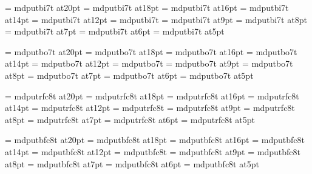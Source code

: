 \font\twentyitbf=      mdputbi7t at20pt
\font\eighteenitbf=    mdputbi7t at18pt
\font\sixteenitbf=     mdputbi7t at16pt
\font\fourteenitbf=    mdputbi7t at14pt
\font\twelveitbf=      mdputbi7t at12pt
\font\itbf=            mdputbi7t
\font\nineitbf=        mdputbi7t at9pt
\font\eightitbf=       mdputbi7t at8pt
\font\sevenitbf=       mdputbi7t at7pt
\font\sixitbf=         mdputbi7t at6pt
\font\fiveitbf=        mdputbi7t at5pt

\font\twentyslbf=      mdputbo7t at20pt
\font\eighteenslbf=    mdputbo7t at18pt
\font\sixteenslbf=     mdputbo7t at16pt
\font\fourteenslbf=    mdputbo7t at14pt
\font\twelveslbf=      mdputbo7t at12pt
\font\slbf=            mdputbo7t
\font\nineslbf=        mdputbo7t at9pt
\font\eightslbf=       mdputbo7t at8pt
\font\sevenslbf=       mdputbo7t at7pt
\font\sixslbf=         mdputbo7t at6pt
\font\fiveslbf=        mdputbo7t at5pt

\font\twentycaps=      mdputrfc8t at20pt
\font\eighteencaps=    mdputrfc8t at18pt
\font\sixteencaps=     mdputrfc8t at16pt
\font\fourteencaps=    mdputrfc8t at14pt
\font\twelvecaps=      mdputrfc8t at12pt
\font\caps=            mdputrfc8t %
\font\ninecaps=        mdputrfc8t at9pt
\font\eightcaps=       mdputrfc8t at8pt
\font\sevencaps=       mdputrfc8t at7pt
\font\sixcaps=         mdputrfc8t at6pt
\font\fivecaps=        mdputrfc8t at5pt

\font\twentycaps=      mdputbfc8t at20pt
\font\eighteencaps=    mdputbfc8t at18pt
\font\sixteencaps=     mdputbfc8t at16pt
\font\fourteencaps=    mdputbfc8t at14pt
\font\twelvecaps=      mdputbfc8t at12pt
\font\caps=            mdputbfc8t
\font\ninecaps=        mdputbfc8t at9pt
\font\eightcaps=       mdputbfc8t at8pt
\font\sevencaps=       mdputbfc8t at7pt
\font\sixcaps=         mdputbfc8t at6pt
\font\fivecaps=        mdputbfc8t at5pt

\teni=-0.01pt %

\rm
